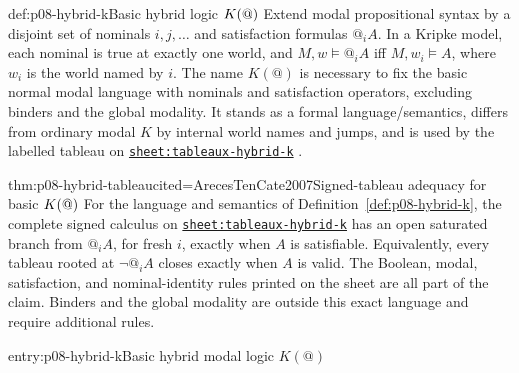 \begin{hbdefinition}{def:p08-hybrid-k}{Basic hybrid logic \(K({\char64})\)}
Extend modal propositional syntax by a disjoint set of nominals
\(i,j,\ldots\) and satisfaction formulas \(@_iA\). In a Kripke model, each
nominal is true at exactly one world, and
\(M,w\models@_iA\) iff \(M,w_i\models A\), where \(w_i\) is the world named by
\(i\). The name \(K(@)\) is necessary to fix the basic normal modal language
with nominals and satisfaction operators, excluding binders and the global
modality. It stands as a formal language/semantics, differs from ordinary
modal \(K\) by internal world names and jumps, and is used by the labelled
tableau on
\hyperref[sheet:tableaux-hybrid-k]{\texttt{sheet:tableaux-hybrid-k}}
\cite{ArecesTenCate2007}.
\end{hbdefinition}

\begin{hbtheorem}{thm:p08-hybrid-tableau}{cited=ArecesTenCate2007}{Signed-tableau adequacy for basic \(K({\char64})\)}
For the language and semantics of
Definition~\ref{def:p08-hybrid-k}, the complete signed calculus on
\hyperref[sheet:tableaux-hybrid-k]{\texttt{sheet:tableaux-hybrid-k}} has an
open saturated branch from \(@_iA\), for fresh \(i\), exactly when \(A\) is
satisfiable.  Equivalently, every tableau rooted at \(\neg@_iA\) closes exactly
when \(A\) is valid.  The Boolean, modal, satisfaction, and nominal-identity
rules printed on the sheet are all part of the claim.  Binders and the global
modality are outside this exact language and require additional rules.
\end{hbtheorem}

\begin{systementry}{entry:p08-hybrid-k}{Basic hybrid modal logic \(K(@)\)}
\end{systementry}


